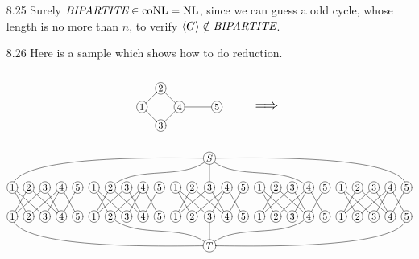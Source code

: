 \begin{itemize}
	\item[8.25]
	Surely $\textit{BIPARTITE} \in \textrm{coNL} = \textrm{NL}$, since we can guess a odd cycle, whose length is no more than $n$, to verify $\langle {G} \rangle \notin \textit{BIPARTITE}$.
	
	\item[8.26]
	Here is a sample which shows how to do reduction.
	\begin{gather*}
		\xymatrix@ur@R=1pc@C=1pc{
			*+[o][F-]{1} \ar@{-}[d] \ar@{-}[r] & *+[o][F-]{2} & \\
			*+[o][F-]{3} & *+[o][F-]{4} \ar@{-}[u] \ar@{-}[l] \ar@{-}[rd] & \\
			& & *+[o][F-]{5}
		}
		\scalebox{1.5}{$\qquad \implies$} \\
		\xymatrix@R=1.5pc@C=0.5pc{
			&&&&&&&&&&&& 
			*+[o][F-]{S} 
			\ar@{-}@(l,u)[dllllllllllll]
			\ar@{-}@(ld,ur)[dllllll]
			\ar@{-}[d]
			\ar@{-}@(rd,ul)[drrrrrr]
			\ar@{-}@(r,u)[drrrrrrrrrrrr]
			&&&&&&&&&&&& \\
			*+[o][F-]{1} \ar@{-}[rd] \ar@{-}[rrd] & *+[o][F-]{2} \ar@{-}[dl] \ar@{-}[drr] & *+[o][F-]{3} \ar@{-}[dll] \ar@{-}[dr] & *+[o][F-]{4} \ar@{-}[dl] \ar@{-}[dll] \ar@{-}[dr] & *+[o][F-]{5} \ar@{-}[dl] &
			*+[o][F-]{1} \ar@{-}[rd] \ar@{-}[rrd] & *+[o][F-]{2} \ar@{-}[dl] \ar@{-}[drr] & *+[o][F-]{3} \ar@{-}[dll] \ar@{-}[dr] & *+[o][F-]{4} \ar@{-}[dl] \ar@{-}[dll] \ar@{-}[dr] & *+[o][F-]{5} \ar@{-}[dl] &
			*+[o][F-]{1} \ar@{-}[rd] \ar@{-}[rrd] & *+[o][F-]{2} \ar@{-}[dl] \ar@{-}[drr] & *+[o][F-]{3} \ar@{-}[dll] \ar@{-}[dr] & *+[o][F-]{4} \ar@{-}[dl] \ar@{-}[dll] \ar@{-}[dr] & *+[o][F-]{5} \ar@{-}[dl] &
			*+[o][F-]{1} \ar@{-}[rd] \ar@{-}[rrd] & *+[o][F-]{2} \ar@{-}[dl] \ar@{-}[drr] & *+[o][F-]{3} \ar@{-}[dll] \ar@{-}[dr] & *+[o][F-]{4} \ar@{-}[dl] \ar@{-}[dll] \ar@{-}[dr] & *+[o][F-]{5} \ar@{-}[dl] &
			*+[o][F-]{1} \ar@{-}[rd] \ar@{-}[rrd] & *+[o][F-]{2} \ar@{-}[dl] \ar@{-}[drr] & *+[o][F-]{3} \ar@{-}[dll] \ar@{-}[dr] & *+[o][F-]{4} \ar@{-}[dl] \ar@{-}[dll] \ar@{-}[dr] & *+[o][F-]{5} \ar@{-}[dl] \\
			*+[o][F-]{1} & *+[o][F-]{2} & *+[o][F-]{3} & *+[o][F-]{4} & *+[o][F-]{5} &
			*+[o][F-]{1} & *+[o][F-]{2} & *+[o][F-]{3} & *+[o][F-]{4} & *+[o][F-]{5} &
			*+[o][F-]{1} & *+[o][F-]{2} & *+[o][F-]{3} & *+[o][F-]{4} & *+[o][F-]{5} &
			*+[o][F-]{1} & *+[o][F-]{2} & *+[o][F-]{3} & *+[o][F-]{4} & *+[o][F-]{5} &
			*+[o][F-]{1} & *+[o][F-]{2} & *+[o][F-]{3} & *+[o][F-]{4} & *+[o][F-]{5} \\
			&&&&&&&&&&&& 
			*+[o][F-]{T} 
			\ar@{-}@(l,d)[ullllllllllll]
			\ar@{-}@(lu,dr)[ullllll]
			\ar@{-}[u]
			\ar@{-}@(ru,dl)[urrrrrr]
			\ar@{-}@(r,d)[urrrrrrrrrrrr]
			&&&&&&&&&&&&
		}
	\end{gather*}
	

\end{itemize}
